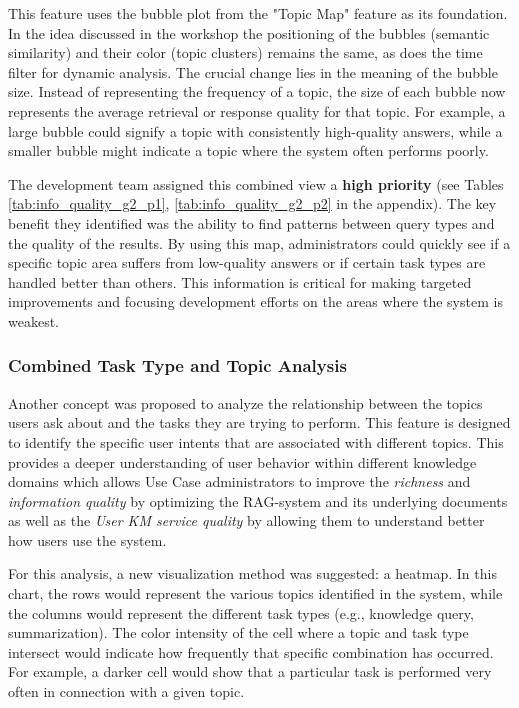 \documentclass[
	english,
	ruledheaders=section,%
	class=report,%
	thesis={type=bachelor},%
	accentcolor=1b,%
	custommargins=true,%
	marginpar=false,%
	parskip=half-,%
	fontsize=11pt,%
	DIV=14,
]{tudapub}
\begin{document}
This feature uses the bubble plot from the "Topic Map" feature as its foundation. In the idea discussed in the workshop the positioning of the bubbles (semantic similarity) and their color (topic clusters) remains the same, as does the time filter for dynamic analysis. The crucial change lies in the meaning of the bubble size. Instead of representing the frequency of a topic, the size of each bubble now represents the average retrieval or response quality for that topic. For example, a large bubble could signify a topic with consistently high-quality answers, while a smaller bubble might indicate a topic where the system often performs poorly.

The development team assigned this combined view a \textbf{high priority} (see Tables \ref{tab:info_quality_g2_p1},  \ref{tab:info_quality_g2_p2} in the appendix). The key benefit they identified was the ability to find patterns between query types and the quality of the results. By using this map, administrators could quickly see if a specific topic area suffers from low-quality answers or if certain task types are handled better than others. This information is critical for making targeted improvements and focusing development efforts on the areas where the system is weakest.
\subsubsection{Combined Task Type and Topic Analysis}
Another concept was proposed to analyze the relationship between the topics users ask about and the tasks they are trying to perform. This feature is designed to identify the specific user intents that are associated with different topics. This provides a deeper understanding of user behavior within different knowledge domains which allows Use Case administrators to improve the \textit{richness} and \textit{information quality} \parencite[pp.~57--58]{DeloneMcLean2003ISSuccessTenYearUpdate} by optimizing the RAG-system and its underlying documents as well as the \textit{User KM service quality} \parencite[pp.~58--59]{DeloneMcLean2003ISSuccessTenYearUpdate} by allowing them to understand better how users use the system.

For this analysis, a new visualization method was suggested: a heatmap. In this chart, the rows would represent the various topics identified in the system, while the columns would represent the different task types (e.g., knowledge query, summarization). The color intensity of the cell where a topic and task type intersect would indicate how frequently that specific combination has occurred. For example, a darker cell would show that a particular task is performed very often in connection with a given topic.
\end{document}
